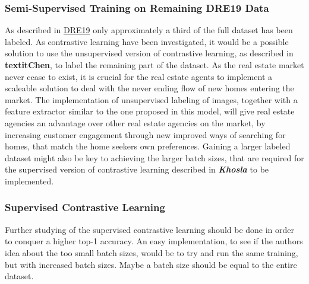 \subsubsection{Semi-Supervised Training on Remaining DRE19 Data} \label{sec:fwork1}
As described in \hyperref[sec:DRE19]{DRE19} only approximately a third of the full dataset has been labeled. As contrastive learning have been investigated, it would be a possible solution to use the unsupervised version of contrastive learning, as described in \textbf{textit{Chen}}\autocite{chen2020simple}, to label the remaining part of the dataset. As the real estate market never cease to exist, it is crucial for the real estate agents to implement a scaleable solution to deal with the never ending flow of new homes entering the market. The implementation of unsupervised labeling of images, together with a feature extractor similar to the one proposed in this model, will give real estate agencies an advantage over other real estate agencies on the market, by increasing customer engagement through new improved ways of searching for homes, that match the home seekers own preferences. Gaining a larger labeled dataset might also be key to achieving the larger batch sizes, that are required for the supervised version of contrastive learning described in \textbf{\textit{Khosla}}\autocite{khosla2020supervised} to be implemented.

\subsubsection{Supervised Contrastive Learning} \label{sec:fwork2}
Further studying of the supervised contrastive learning should be done in order to conquer a higher top-1 accuracy. An easy implementation, to see if the authors idea about the too small batch sizes, would be to try and run the same training, but with increased batch sizes. Maybe a batch size should be equal to the entire dataset.
